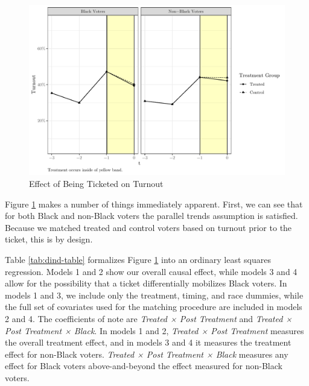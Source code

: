 \documentclass[
  12pt,
]{article}
\begin{document}
\begin{figure}[H]

{\centering \includegraphics{draft_paper_files/figure-latex/did1-1} 

}

\caption{\label{fig:did-1}Effect of Being Ticketed on Turnout}\label{fig:did1}
\end{figure}

Figure \ref{fig:did1} makes a number of things immediately apparent. First, we can see that for both Black and non-Black voters the parallel trends assumption is satisfied. Because we matched treated and control voters based on turnout prior to the ticket, this is by design.

Table \ref{tab:dind-table} formalizes Figure \ref{fig:did1} into an ordinary least squares regression. Models 1 and 2 show our overall causal effect, while models 3 and 4 allow for the possibility that a ticket differentially mobilizes Black voters. In models 1 and 3, we include only the treatment, timing, and race dummies, while the full set of covariates used for the matching procedure are included in models 2 and 4. The coefficients of note are \emph{Treated × Post Treatment} and \emph{Treated × Post Treatment × Black}. In models 1 and 2, \emph{Treated × Post Treatment} measures the overall treatment effect, and in models 3 and 4 it measures the treatment effect for non-Black voters. \emph{Treated × Post Treatment × Black} measures any effect for Black voters above-and-beyond the effect measured for non-Black voters.

\begin{singlespace}

\end{singlespace}
\end{document}
